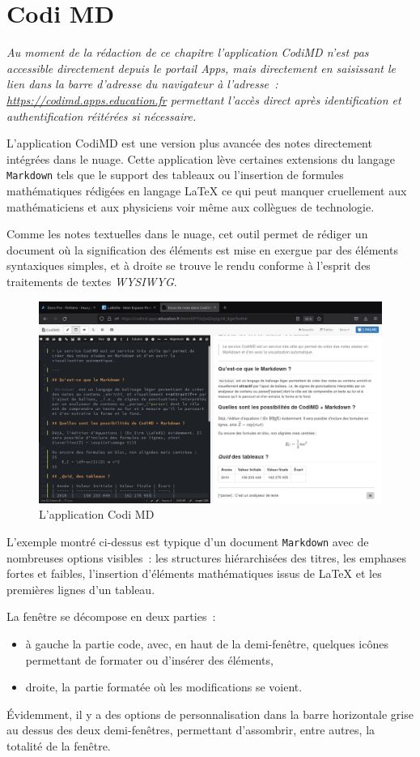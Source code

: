 \chapter{Codi MD}

\emph{
	Au moment de la rédaction de ce chapitre l'application CodiMD n'est pas accessible directement depuis le portail Apps, mais directement en saisissant le lien dans la barre d'adresse du navigateur à l'adresse~: \newline \url{https://codimd.apps.education.fr} permettant l'accès direct après identification et authentification réitérées si nécessaire.
}

L'application CodiMD est une version plus avancée des notes directement intégrées dans le nuage. 
Cette application lève certaines extensions du langage \texttt{Markdown} tels que le support des tableaux ou l'insertion de formules mathématiques rédigées en langage \LaTeX{} ce qui peut manquer cruellement aux mathématiciens et aux physiciens voir même aux collègues de technologie.

Comme les notes textuelles dans le nuage, cet outil permet de rédiger un document où la signification des éléments est mise en exergue par des éléments syntaxiques simples, et à droite se trouve le rendu conforme à l'esprit des traitements de textes \emph{WYSIWYG\/}.
\begin{figure}
	\centering
	\includegraphics[width=\linewidth]{./Captures/codimd.exemple.png}
	\caption{L'application Codi MD}
\end{figure}

L'exemple montré ci-dessus est typique d'un document \texttt{Markdown} avec de nombreuses options visibles~: les structures hiérarchisées des titres, les emphases fortes et faibles, l'insertion d'éléments mathématiques issus de \LaTeX{} et les premières lignes d'un tableau.

La fenêtre se décompose en deux parties~:
\begin{itemize}
	\item à gauche la partie code, avec, en haut de la demi-fenêtre, quelques icônes permettant de formater ou d'insérer des éléments,
	\item droite, la partie formatée où les modifications se voient.
\end{itemize}

Évidemment, il y a des options de personnalisation dans la barre horizontale grise au dessus des deux demi-fenêtres, permettant d'assombrir, entre autres, la totalité de la fenêtre.